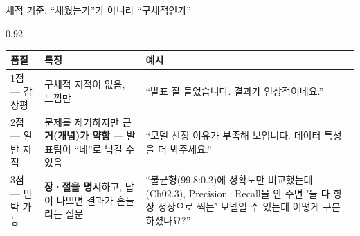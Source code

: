 \begin{frame}{채점 기준: ``채웠는가''가 아니라 ``구체적인가''}
\begin{center}\begin{varwidth}{0.92\textwidth}
  \small
  \begin{tabular}{@{}llp{7.8cm}@{}}
    \toprule
    품질 & 특징 & 예시 \\
    \midrule
    1점 --- 감상평 & 구체적 지적이 없음, 느낌만 &
      ``발표 잘 들었습니다. 결과가 인상적이네요.'' \\
    2점 --- 일반 지적 & 문제를 제기하지만 \textbf{근거(개념)가
      약함} --- 발표팀이 ``네''로 넘길 수 있음 &
      ``모델 선정 이유가 부족해 보입니다. 데이터 특성을 더
      봐주세요.'' \\
    3점 --- 반박 가능 & \textbf{장·절을 명시}하고, 답이 나쁘면
      결과가 흔들리는 질문 & ``불균형(99.8:0.2)에 정확도만
      비교했는데(Ch02.3), Precision·Recall을 안 주면 '둘 다
      항상 정상으로 찍는' 모델일 수 있는데 어떻게 구분
      하셨나요?'' \\
    \bottomrule
  \end{tabular}
\end{varwidth}\end{center}
\end{frame}
